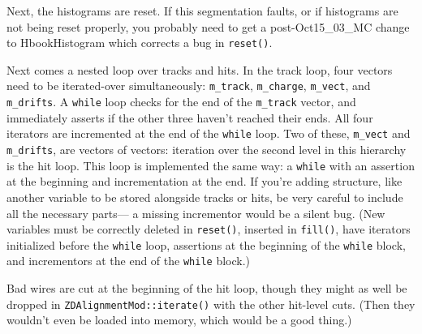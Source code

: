 \documentclass[12pt]{article}
\begin{document}
Next, the histograms are reset.  If this segmentation faults, or if
histograms are not being reset properly, you probably need to get a
post-Oct15\_03\_MC change to HbookHistogram which corrects a bug in
{\tt reset()}.

Next comes a nested loop over tracks and hits.  In the track loop,
four vectors need to be iterated-over simultaneously: {\tt m\_track},
{\tt m\_charge}, {\tt m\_vect}, and {\tt m\_drifts}.  A {\tt while}
loop checks for the end of the {\tt m\_track} vector, and immediately
asserts if the other three haven't reached their ends.  All four
iterators are incremented at the end of the {\tt while} loop.  Two of
these, {\tt m\_vect} and {\tt m\_drifts}, are vectors of vectors:
iteration over the second level in this hierarchy is the hit loop.
This loop is implemented the same way: a {\tt while} with an assertion
at the beginning and incrementation at the end.  If you're adding
structure, like another variable to be stored alongside tracks or
hits, be very careful to include all the necessary parts--- a missing
incrementor would be a silent bug.  (New variables must be correctly
deleted in {\tt reset()}, inserted in {\tt fill()}, have iterators
initialized before the {\tt while} loop, assertions at the beginning
of the {\tt while} block, and incrementors at the end of the
{\tt while} block.)

Bad wires are cut at the beginning of the hit loop, though they might
as well be dropped in {\tt ZDAlignmentMod::iterate()} with the other
hit-level cuts.  (Then they wouldn't even be loaded into memory, which
would be a good thing.)
\end{document}

